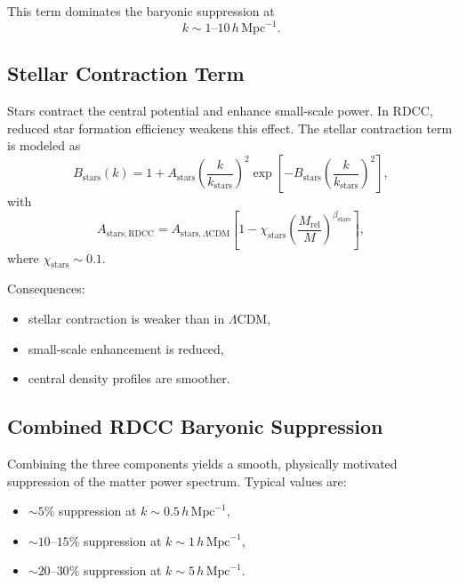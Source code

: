 \documentclass[11pt,a4paper]{article}
\begin{document}
This term dominates the baryonic suppression at
\begin{equation}
k \sim 1\text{--}10\,h\,\mathrm{Mpc}^{-1}.
\end{equation}

\subsection{Stellar Contraction Term}

Stars contract the central potential and enhance small-scale power. In RDCC, reduced star
formation efficiency weakens this effect. The stellar contraction term is modeled as
\begin{equation}
B_{\mathrm{stars}}(k)
=
1
+
A_{\mathrm{stars}}
\left(
\frac{k}{k_{\mathrm{stars}}}
\right)^{2}
\exp\!\left[
-
B_{\mathrm{stars}}
\left(
\frac{k}{k_{\mathrm{stars}}}
\right)^{2}
\right],
\end{equation}
with
\begin{equation}
A_{\mathrm{stars,RDCC}}
=
A_{\mathrm{stars},\Lambda\mathrm{CDM}}
\left[
1
-
\chi_{\mathrm{stars}}
\left(
\frac{M_{\mathrm{rel}}}{M}
\right)^{\beta_{\mathrm{stars}}}
\right],
\end{equation}
where $\chi_{\mathrm{stars}} \sim 0.1$.

Consequences:
\begin{itemize}
\item stellar contraction is weaker than in $\Lambda$CDM,
\item small-scale enhancement is reduced,
\item central density profiles are smoother.
\end{itemize}

\subsection{Combined RDCC Baryonic Suppression}

Combining the three components yields a smooth, physically motivated suppression of the
matter power spectrum. Typical values are:
\begin{itemize}
\item $\sim 5\%$ suppression at $k \sim 0.5\,h\,\mathrm{Mpc}^{-1}$,
\item $\sim 10$–$15\%$ suppression at $k \sim 1\,h\,\mathrm{Mpc}^{-1}$,
\item $\sim 20$–$30\%$ suppression at $k \sim 5\,h\,\mathrm{Mpc}^{-1}$.
\end{itemize}
\end{document}
